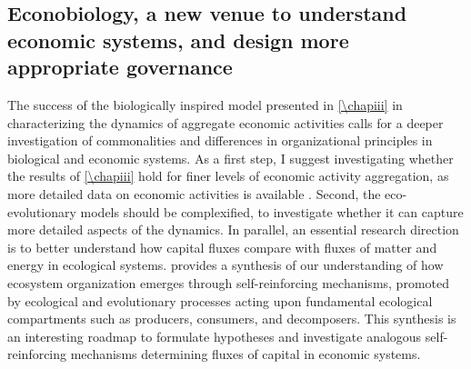

\subsection{Econobiology, a new venue to understand economic systems, and design more appropriate governance}

The success of the biologically inspired model presented in \cref{\chapiii}  in characterizing the dynamics of aggregate economic activities calls for a deeper investigation of commonalities and differences in organizational principles in biological and economic systems.
% 
% 
% 
% 
As a first step, I suggest investigating whether the results of \cref{\chapiii} hold for finer levels of economic activity aggregation, as more detailed data on economic activities is available \citep{Hausmann2011}. 
% 
Second, the eco-evolutionary models should be complexified, to investigate whether it can capture more detailed aspects of the dynamics.
% 
In parallel, an essential research direction is to better understand how capital fluxes \citep{King1993} compare with fluxes of matter and energy \citep{Veldhuis2018} in ecological systems.
% 
\cite{Veldhuis2018} provides a synthesis of our understanding of how ecosystem organization emerges through self-reinforcing mechanisms, promoted by ecological and evolutionary processes acting upon fundamental ecological compartments such as producers, consumers, and decomposers. This synthesis is an interesting roadmap to formulate hypotheses and investigate analogous self-reinforcing mechanisms determining fluxes of capital in economic systems. 
